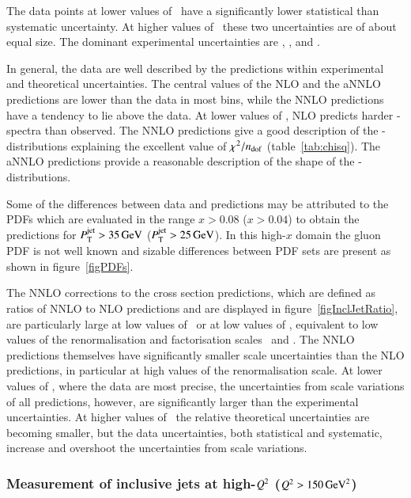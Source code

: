 \documentclass[12pt]{article}
\begin{document}
The data points at lower values of \ptjet\ have a significantly lower statistical than systematic uncertainty. 
At higher values of \ptjet\ these two uncertainties are of about equal size.
The dominant experimental uncertainties are \DJES{}, \DHFS{}, \DMod{} and \DModRW{}.

In general, the data are well described by the predictions within experimental and theoretical uncertainties.
The central values of the  NLO and the aNNLO predictions are lower than the data in most bins, while the NNLO predictions 
have a tendency to lie above the data.
At lower values of \Qsq, NLO predicts harder \ptjet-spectra than observed.
The NNLO predictions give a good description of the \ptjet-distributions
explaining the excellent value of $\chisq/\ndf$ (table~\ref{tab:chisq}).
The aNNLO predictions provide a reasonable description of the shape of the \ptjet-distributions.

Some of the differences between data and predictions may be attributed to the PDFs which are evaluated in the range $x>0.08$ ($x>0.04$) to obtain the predictions for $\ptjet>35\,\GeV$ ($\ptjet>25\,\GeV$). 
In this high-$x$ domain the gluon PDF is not well known and sizable differences
between PDF sets are present as shown in figure~\ref{figPDFs}.

The NNLO corrections to the cross section predictions, which are defined as  
ratios of NNLO to NLO predictions and are displayed in figure~\ref{figInclJetRatio}, 
are particularly large at 
low values of \ptjet\ or at low values of \Qsq, equivalent to low values of
the renormalisation and factorisation scales \mur\ and \muf.
The NNLO predictions themselves have significantly smaller scale uncertainties than the NLO predictions, 
in particular at high values of the renormalisation scale.
At lower values of \ptjet, where the data are most precise, the uncertainties from scale variations 
of all predictions, however, are significantly larger than the experimental uncertainties. 
At higher values of \ptjet\ the relative theoretical uncertainties are becoming smaller, 
but the data uncertainties, both statistical and systematic, increase and overshoot the uncertainties from scale variations.


\begin{boldmath}
\subsubsection{Measurement of inclusive jets at high-$\Qsq$ ($\Qsq>150\,\GeVsq$)}
\end{boldmath}
\end{document}

